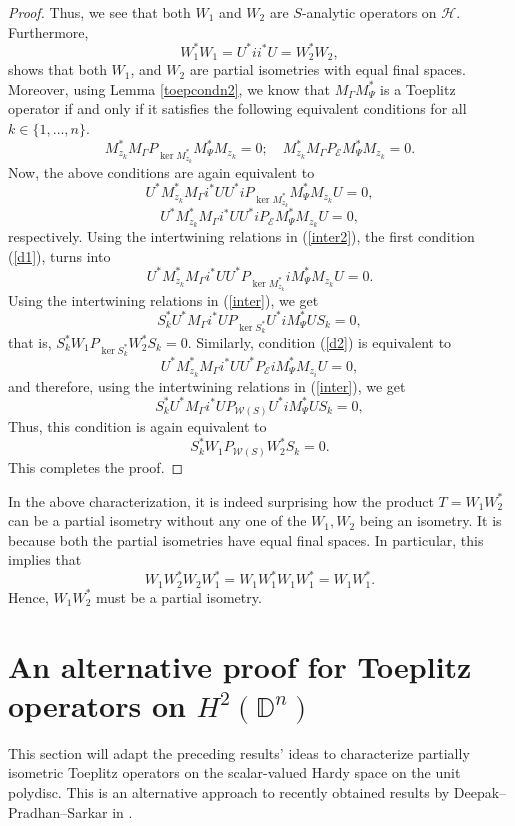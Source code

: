 \documentclass[12pt]{amsart}
\theoremstyle{definition}
\newcommand{\D}{\mathbb{D}}
\newcommand{\1}{{\mbox{\bf 1}}}
\newcommand{\cle}{\mathcal{E}}
\newcommand{\clh}{\mathcal{H}}
\newcommand{\clw}{\mathcal{W}}
\begin{document}
\begin{proof}
Thus, we see that both $W_1$ and $W_2$ are $S$-analytic operators on $\clh$. Furthermore,
\[
W_1^* W_1 = U^* i i^* U = W_2^* W_2,
\]
shows that both $W_1$, and $W_2$ are partial isometries with equal final spaces. Moreover, using Lemma \ref{toepcondn2}, we know that $M_{\Gamma}M_{\Psi}^*$ is a Toeplitz operator if and only if it satisfies the following equivalent conditions for all $k \in \{1,\ldots,n\}$.
\[
M_{z_k}^* M_{\Gamma}P_{\ker M_{z_k}^*} M_{\Psi}^* M_{z_k} = 0; \quad M_{z_k}^* M_{\Gamma}P_{\cle} M_{\Psi}^* M_{z_k} = 0.
\]
Now, the above conditions are again equivalent to 
\begin{equation}\label{d1}
U^* M_{z_k}^* M_{\Gamma} i^* U U^* i P_{\ker M_{z_k}^*} M_{\Psi}^* M_{z_k} U= 0,
\end{equation}
\begin{equation}\label{d2}
U^* M_{z_k}^* M_{\Gamma} i^*U U^*iP_{\cle}M_{\Psi}^* M_{z_k} U= 0,
\end{equation}
respectively. Using the intertwining relations in (\ref{inter2}), the first condition (\ref{d1}), turns into
\[
U^* M_{z_k}^* M_{\Gamma} i^* U U^* P_{\ker M_{z_k}^*} i M_{\Psi}^* M_{z_k} U= 0.
\]
Using the intertwining relations in (\ref{inter}), we get
\[
S_k^* U^* M_{\Gamma} i^* U P_{\ker S_k^*} U^* i M_{\Psi}^*  U S_k= 0, 
\]
that is, $S_k^* W_1 P_{\ker S_k^*} W_2^* S_k= 0$. Similarly, condition (\ref{d2}) is equivalent to
\[
U^* M_{z_k}^* M_{\Gamma} i^*U U^* P_{\cle}i M_{\Psi}^* M_{z_i} U= 0,
\]
and therefore, using the intertwining relations in (\ref{inter}), we get
\[
S_k^* U^* M_{\Gamma} i^*U P_{\clw(S)} U^* i M_{\Psi}^* U S_k= 0,
\]
Thus, this condition is again equivalent to
\[
S_k^* W_1 P_{\clw(S)} W_2^* S_k = 0.
\]
This completes the proof.
\end{proof}
In the above characterization, it is indeed surprising how the product $T = W_1 W_2^*$ can be a partial isometry without any one of the $W_1, W_2$ being an isometry. It is because both the partial isometries have equal final spaces. In particular, this implies that
\[
W_1 W_2^* W_2 W_1^* = W_1 W_1^* W_1 W_1^* = W_1 W_1^*.
\]
Hence, $W_1 W_2^*$ must be a partial isometry.
\section{An alternative proof for Toeplitz operators on $H^2(\D^n)$}\label{scalar}

This section will adapt the preceding results' ideas to characterize partially isometric Toeplitz operators on the scalar-valued Hardy space on the unit polydisc. This is an alternative approach to recently obtained results by  Deepak--Pradhan--Sarkar in \cite{KPS}.
\end{document}
